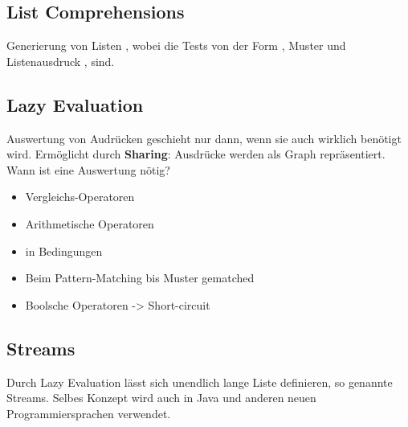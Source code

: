         \subsection{List Comprehensions}
        Generierung von Listen \code{\([e | q_1, ..., q_m]\)}, wobei die  Tests von der Form
        , Muster  und Listenausdruck , sind.

        \subsection{Lazy Evaluation}
        Auswertung von Audrücken geschieht nur dann, wenn sie auch wirklich benötigt wird. Ermöglicht durch \textbf{Sharing}:
        Ausdrücke werden als Graph repräsentiert.\\
        Wann ist eine Auswertung nötig?
        \begin{itemize}
          \item Vergleichs-Operatoren
          \item Arithmetische Operatoren
          \item in Bedingungen
          \item Beim Pattern-Matching bis Muster gematched
          \item Boolsche Operatoren -> Short-circuit
        \end{itemize}

        \subsection{Streams}
        Durch Lazy Evaluation lässt sich unendlich lange Liste definieren, so genannte Streams.
        Selbes Konzept wird auch in Java und anderen neuen Programmiersprachen verwendet.


